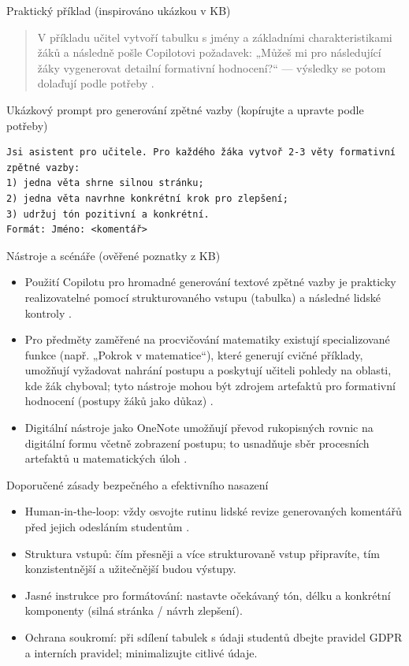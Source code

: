 \documentclass{report}%
\begin{document}
Praktický příklad (inspirováno ukázkou v KB)
\begin{quote}
V příkladu učitel vytvoří tabulku s jmény a základními charakteristikami žáků a následně pošle Copilotovi požadavek: „Můžeš mi pro následující žáky vygenerovat detailní formativní hodnocení?“ — výsledky se potom dolaďují podle potřeby \cite{kb_ai_101_tipu_pdf_04e4a115_page_21_2}.
\end{quote}

Ukázkový prompt pro generování zpětné vazby (kopírujte a upravte podle potřeby)
\begin{verbatim}
Jsi asistent pro učitele. Pro každého žáka vytvoř 2-3 věty formativní zpětné vazby:
1) jedna věta shrne silnou stránku;
2) jedna věta navrhne konkrétní krok pro zlepšení;
3) udržuj tón pozitivní a konkrétní.
Formát: Jméno: <komentář>
\end{verbatim}

Nástroje a scénáře (ověřené poznatky z KB)
\begin{itemize}
  \item Použití Copilotu pro hromadné generování textové zpětné vazby je prakticky realizovatelné pomocí strukturovaného vstupu (tabulka) a následné lidské kontroly \cite{kb_ai_101_tipu_pdf_04e4a115_page_21_2}.
  \item Pro předměty zaměřené na procvičování matematiky existují specializované funkce (např. „Pokrok v matematice“), které generují cvičné příklady, umožňují vyžadovat nahrání postupu a poskytují učiteli pohledy na oblasti, kde žák chyboval; tyto nástroje mohou být zdrojem artefaktů pro formativní hodnocení (postupy žáků jako důkaz) \cite{kb_ai_101_tipu_pdf_04e4a115_page_8_1}.
  \item Digitální nástroje jako OneNote umožňují převod rukopisných rovnic na digitální formu včetně zobrazení postupu; to usnadňuje sběr procesních artefaktů u matematických úloh \cite{kb_ai_101_tipu_pdf_04e4a115_page_8_1}.
\end{itemize}

Doporučené zásady bezpečného a efektivního nasazení
\begin{itemize}
  \item Human‑in‑the‑loop: vždy osvojte rutinu lidské revize generovaných komentářů před jejich odesláním studentům \cite{kb_ai_101_tipu_pdf_04e4a115_page_21_2}.
  \item Struktura vstupů: čím přesněji a více strukturovaně vstup připravíte, tím konzistentnější a užitečnější budou výstupy.
  \item Jasné instrukce pro formátování: nastavte očekávaný tón, délku a konkrétní komponenty (silná stránka / návrh zlepšení).
  \item Ochrana soukromí: při sdílení tabulek s údaji studentů dbejte pravidel GDPR a interních pravidel; minimalizujte citlivé údaje.
\end{itemize}
\end{document}
